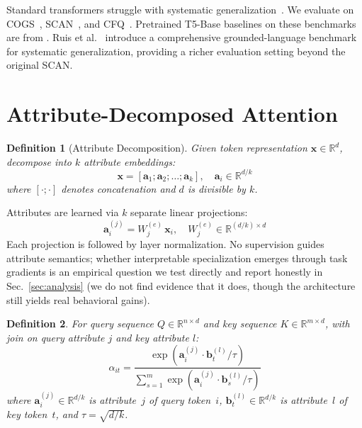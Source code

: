 \documentclass[review]{elsarticle}
\newtheorem{definition}{Definition}
\newcommand{\R}{\mathbb{R}}
\begin{document}
Standard transformers struggle with systematic generalization~\cite{lake2018generalization}. We evaluate on COGS~\cite{kim2020cogs}, SCAN~\cite{lake2018scan,ruis2025neurips}, and CFQ~\cite{keysers2020measuring}. Pretrained T5-Base baselines on these benchmarks are from \cite{furrer2020compositional}. Ruis et al.~\cite{ruis2025neurips} introduce a comprehensive grounded-language benchmark for systematic generalization, providing a richer evaluation setting beyond the original SCAN.

\section{Attribute-Decomposed Attention}
\label{sec:method}

\begin{definition}[Attribute Decomposition]
Given token representation $\mathbf{x} \in \R^d$, decompose into $k$ attribute embeddings:
\begin{equation}
\mathbf{x} = [\mathbf{a}_1; \mathbf{a}_2; \ldots; \mathbf{a}_k], \quad \mathbf{a}_i \in \R^{d/k}
\end{equation}
where $[\cdot;\cdot]$ denotes concatenation and $d$ is divisible by $k$.
\end{definition}

Attributes are learned via $k$ separate linear projections:
\begin{equation}
\mathbf{a}_i^{(j)} = W_j^{(e)}\,\mathbf{x}_i, \quad W_j^{(e)} \in \R^{(d/k)\times d}
\end{equation}
Each projection is followed by layer normalization. No supervision guides attribute semantics; whether interpretable specialization emerges through task gradients is an empirical question we test directly and report honestly in Sec.~\ref{sec:analysis} (we do not find evidence that it does, though the architecture still yields real behavioral gains).

\begin{definition}For query sequence $Q \in \R^{n \times d}$ and key sequence $K \in \R^{m \times d}$, with join on query attribute $j$ and key attribute $l$:
\begin{equation}
\alpha_{it} = \frac{\exp\!\left(\mathbf{a}_i^{(j)} \cdot \mathbf{b}_t^{(l)} / \tau\right)}{\sum_{s=1}^{m} \exp\!\left(\mathbf{a}_i^{(j)} \cdot \mathbf{b}_s^{(l)} / \tau\right)}
\label{eq:join}
\end{equation}
where $\mathbf{a}_i^{(j)} \in \R^{d/k}$ is attribute~$j$ of query token~$i$, $\mathbf{b}_t^{(l)} \in \R^{d/k}$ is attribute~$l$ of key token~$t$, and $\tau = \sqrt{d/k}$.
\end{definition}
\end{document}
